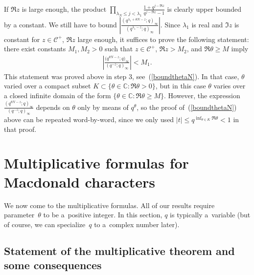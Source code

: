 \documentclass[pdftex]{sigma}
\numberwithin{equation}{section}
\newcommand{\C}{\mathbb{C}}
\newcommand{\CC}{\mathcal{C}}
\begin{document}
If $\Re z$ is large enough, the product $\prod\limits_{\lambda_N \leq j < \lambda_1}{\frac{1 + q^{j - \Re z}}{q^{j - \Re z} - 1}}$ is clearly upper bounded by a constant. We still have to bound $\left|\frac{(q^{\lambda_1 + \theta N - z}; q)_{\infty}}{(q^{\lambda_1 - z}; q)_{\infty}}\right|$. Since $\lambda_1$ is real and $\Im z$ is constant for $z\in\CC^+$, $\Re z$ large enough, it suf\/f\/ices to prove the following statement: there exist constants $M_1, M_2 > 0$ such that $z\in\CC^+$, $\Re z > M_2$, and $\Re\theta \geq M$ imply
\begin{gather*}
\left| \frac{\big(q^{\theta N - z}; q\big)_{\infty}}{(q^{-z}; q)_{\infty}} \right| < M_1.
\end{gather*}
This statement was proved above in step 3, see~(\ref{boundthetaN}). In that case, $\theta$ varied over a compact subset $K\subset\{\theta\in\C\colon \Re\theta > 0\}$, but in this case $\theta$ varies over a closed inf\/inite domain of the form $\{\theta\in\C\colon \Re\theta \geq M\}$. However, the expression $\frac{(q^{\theta N - z}; q)_{\infty}}{(q^{-z}; q)_{\infty}}$ depends on $\theta$ only by means of $q^{\theta}$, so the proof of~(\ref{boundthetaN}) above can be repeated word-by-word, since we only used $|t|\leq q^{\inf_{\theta\in K}{\Re\theta}}< 1$ in that proof.


\section{Multiplicative formulas for Macdonald characters}\label{macdonaldmultiplicativesec}

We now come to the multiplicative formulas. All of our results require parameter~$\theta$ to be a~positive integer. In this section, $q$ is typically a~variable (but of course, we can specialize~$q$ to a~complex number later).

\subsection{Statement of the multiplicative theorem and some consequences}\label{macdonaldmultiplicativesubsec1}
\end{document}
